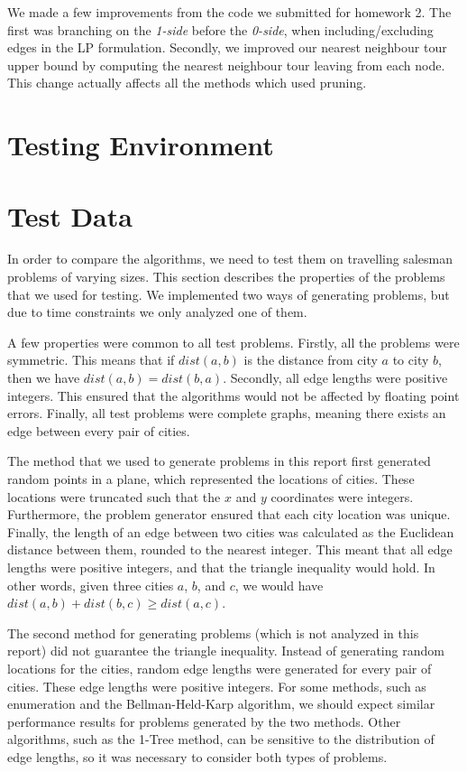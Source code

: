 \documentclass[11pt]{article}
\begin{document}
We made a few improvements from the code we submitted for homework 2. The first was branching on the \emph{1-side} before the \emph{0-side}, when including/excluding edges in the LP formulation. Secondly, we improved our nearest neighbour tour upper bound by computing the nearest neighbour tour leaving from each node. This change actually affects all the methods which used pruning. 

\section{Testing Environment}
\label{sec:environment}

\section{Test Data}
\label{sec:data}

In order to compare the algorithms, we need to test them on travelling salesman problems of varying sizes. This section describes the properties of the problems that we used for testing. We implemented two ways of generating problems, but due to time constraints we only analyzed one of them.

A few properties were common to all test problems. Firstly, all the problems were symmetric. This means that if $dist(a,b)$ is the distance from city $a$ to city $b$, then we have $dist(a,b) = dist(b,a)$. Secondly, all edge lengths were positive integers. This ensured that the algorithms would not be affected by floating point errors. Finally, all test problems were complete graphs, meaning there exists an edge between every pair of cities.

The method that we used to generate problems in this report first generated random points in a plane, which represented the locations of cities. These locations were truncated such that the $x$ and $y$ coordinates were integers. Furthermore, the problem generator ensured that each city location was unique. Finally, the length of an edge between two cities was calculated as the Euclidean distance between them, rounded to the nearest integer. This meant that all edge lengths were positive integers, and that the triangle inequality would hold. In other words, given three cities $a$, $b$, and $c$, we would have $dist(a,b) + dist(b,c) \geq dist(a,c)$.

The second method for generating problems (which is not analyzed in this report) did not guarantee the triangle inequality. Instead of generating random locations for the cities, random edge lengths were generated for every pair of cities. These edge lengths were positive integers. For some methods, such as enumeration and the Bellman-Held-Karp algorithm, we should expect similar performance results for problems generated by the two methods. Other algorithms, such as the 1-Tree method, can be sensitive to the distribution of edge lengths, so it was necessary to consider both types of problems.
\end{document}
